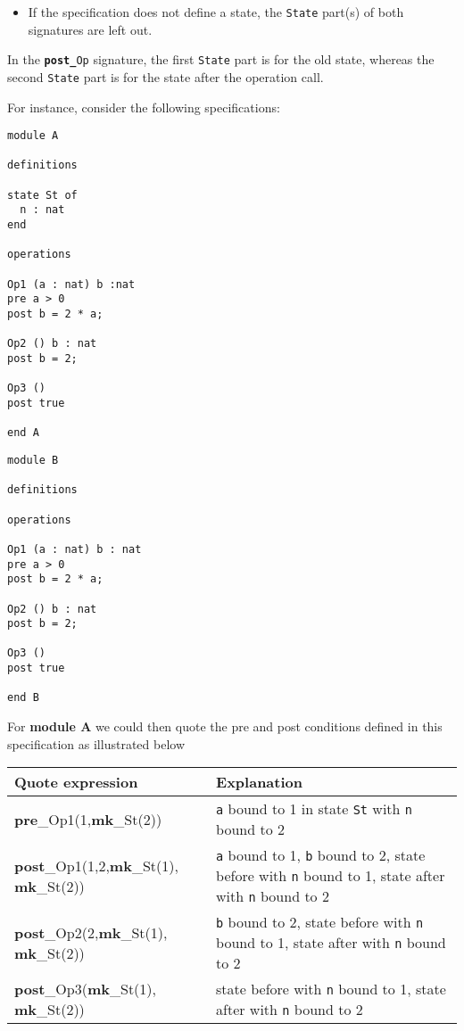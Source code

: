 \documentclass{overturerepchap}
\newcommand{\keyw}[1]{{\bf\ttfamily #1}}
\begin{document}
\begin{description}
\begin{itemize}
\item If the specification does not define a state, the {\tt State} part(s)
  of both signatures are left out.
\end{itemize}

In the {\tt \keyw{post\_}Op} signature, the first {\tt State} part is for
the old state, whereas the second {\tt State} part is for the 
state after the operation call.

For instance, consider the following specifications:

\begin{lstlisting}
module A

definitions

state St of
  n : nat
end

operations

Op1 (a : nat) b :nat
pre a > 0
post b = 2 * a;

Op2 () b : nat
post b = 2;

Op3 ()
post true

end A
\end{lstlisting}

\begin{lstlisting}
module B

definitions

operations

Op1 (a : nat) b : nat
pre a > 0
post b = 2 * a;

Op2 () b : nat
post b = 2;

Op3 ()
post true

end B
\end{lstlisting}

For \textbf{module A} we could then quote the pre and post conditions
defined in this specification as illustrated below

\begin{tabular}{|p{}|p{}|} \hline
\textrm{Quote expression} & Explanation \\ \hline
\keyw{pre}\_Op1(1,\keyw{mk}\_St(2))              
  & \texttt{a} bound to 1 in state \texttt{St} with \texttt{n}  bound to 2 \\
\keyw{post}\_Op1(1,2,\keyw{mk}\_St(1), \keyw{mk}\_St(2)) 
  & \texttt{a} bound to 1, \texttt{b} bound to 2, state before with
    \texttt{n} bound to 1, state after with \texttt{n} bound to 2 \\
\keyw{post}\_Op2(2,\keyw{mk}\_St(1), \keyw{mk}\_St(2))   
  & \texttt{b} bound to 2, state before with \texttt{n} bound to 1, state
    after with \texttt{n} bound to 2 \\
\keyw{post}\_Op3(\keyw{mk}\_St(1), \keyw{mk}\_St(2))     
  & state before with \texttt{n} bound to 1, state after with
    \texttt{n} bound to 2 \\
\hline
\end{tabular}


\end{description}
\end{document}
